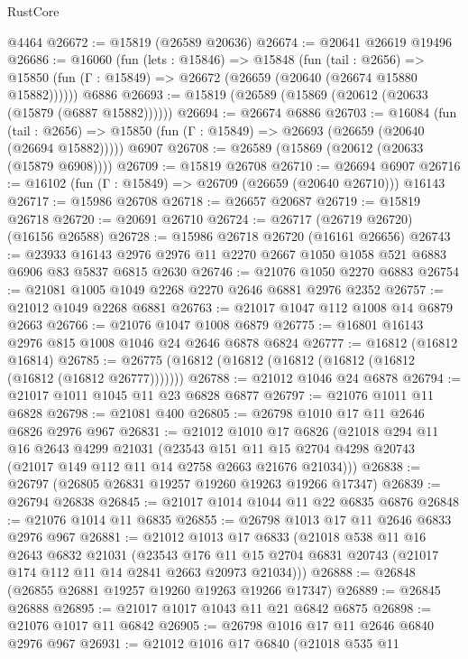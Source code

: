 \begin{lexlean}{RustCore}
\begin{coremodule}
    @4464
@26672 := @15819 (@26589 @20636)
@26674 := @20641 @26619 @19496
@26686 := @16060
    (fun (lets : @15846) =>
    @15848
      (fun (tail : @2656) =>
      @15850 (fun (Γ : @15849) => @26672 (@26659 (@20640 (@26674 @15880 @15882))))))
    @6886
@26693 := @15819 (@26589 (@15869 (@20612 (@20633 (@15879 (@6887 @15882))))))
@26694 := @26674 @6886
@26703 := @16084
    (fun (tail : @2656) => @15850 (fun (Γ : @15849) => @26693 (@26659 (@20640 (@26694 @15882)))))
    @6907
@26708 := @26589 (@15869 (@20612 (@20633 (@15879 @6908))))
@26709 := @15819 @26708
@26710 := @26694 @6907
@26716 := @16102 (fun (Γ : @15849) => @26709 (@26659 (@20640 @26710))) @16143
@26717 := @15986 @26708
@26718 := @26657 @20687
@26719 := @15819 @26718
@26720 := @20691 @26710
@26724 := @26717 (@26719 @26720) (@16156 @26588)
@26728 := @15986 @26718 @26720 (@16161 @26656)
@26743 := @23933
    @16143
    @2976
    @2976
    @11
    @2270
    @2667
    @1050
    @1058
    @521
    @6883
    @6906
    @83
    @5837
    @6815
    @2630
@26746 := @21076 @1050 @2270 @6883
@26754 := @21081 @1005 @1049 @2268 @2270 @2646 @6881 @2976 @2352
@26757 := @21012 @1049 @2268 @6881
@26763 := @21017 @1047 @112 @1008 @14 @6879 @2663
@26766 := @21076 @1047 @1008 @6879
@26775 := @16801 @16143 @2976 @815 @1008 @1046 @24 @2646 @6878 @6824
@26777 := @16812 (@16812 @16814)
@26785 := @26775 (@16812 (@16812 (@16812 (@16812 (@16812 (@16812 (@16812 @26777)))))))
@26788 := @21012 @1046 @24 @6878
@26794 := @21017 @1011 @1045 @11 @23 @6828 @6877
@26797 := @21076 @1011 @11 @6828
@26798 := @21081 @400
@26805 := @26798 @1010 @17 @11 @2646 @6826 @2976 @967
@26831 := @21012
    @1010
    @17
    @6826
    (@21018
      @294
      @11
      @16
      @2643
      @4299
      @21031
      (@23543 @151 @11 @15 @2704 @4298 @20743 (@21017 @149 @112 @11 @14 @2758 @2663 @21676 @21034)))
@26838 := @26797 (@26805 @26831 @19257 @19260 @19263 @19266 @17347)
@26839 := @26794 @26838
@26845 := @21017 @1014 @1044 @11 @22 @6835 @6876
@26848 := @21076 @1014 @11 @6835
@26855 := @26798 @1013 @17 @11 @2646 @6833 @2976 @967
@26881 := @21012
    @1013
    @17
    @6833
    (@21018
      @538
      @11
      @16
      @2643
      @6832
      @21031
      (@23543 @176 @11 @15 @2704 @6831 @20743 (@21017 @174 @112 @11 @14 @2841 @2663 @20973 @21034)))
@26888 := @26848 (@26855 @26881 @19257 @19260 @19263 @19266 @17347)
@26889 := @26845 @26888
@26895 := @21017 @1017 @1043 @11 @21 @6842 @6875
@26898 := @21076 @1017 @11 @6842
@26905 := @26798 @1016 @17 @11 @2646 @6840 @2976 @967
@26931 := @21012
    @1016
    @17
    @6840
    (@21018
      @535
      @11

\end{coremodule}
\end{lexlean}
